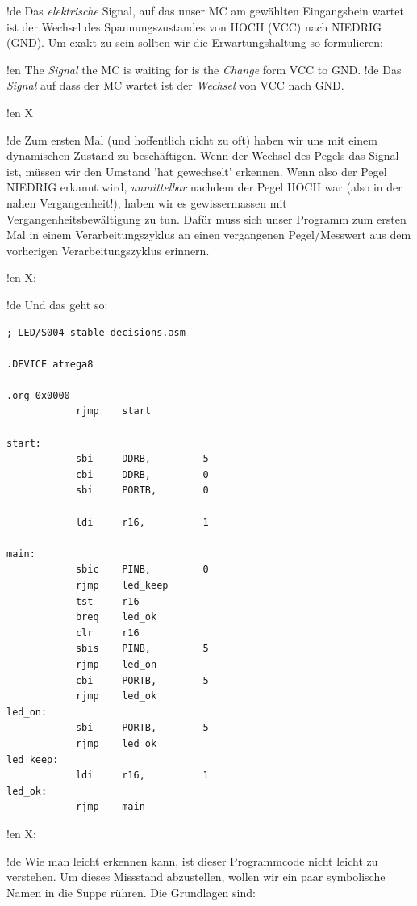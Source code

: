 !de Das \textit{elektrische} Signal, auf das unser MC am gewählten Eingangsbein wartet ist der Wechsel des Spannungszustandes von HOCH (VCC) nach NIEDRIG (GND). Um exakt zu sein sollten wir die Erwartungshaltung so formulieren:

\begin{center}
!en The \emph{Signal} the MC is waiting for is the \emph{Change} form VCC to GND.
!de Das \emph{Signal} auf dass der MC wartet ist der \emph{Wechsel} von VCC nach GND.
\end{center}



!en X

!de Zum ersten Mal (und hoffentlich nicht zu oft) haben wir uns mit einem dynamischen Zustand zu beschäftigen. Wenn der Wechsel des Pegels das Signal ist, müssen wir den Umstand 'hat gewechselt' erkennen. Wenn also der Pegel NIEDRIG erkannt wird, \textit{unmittelbar} nachdem der Pegel HOCH war (also in der nahen Vergangenheit!), haben wir es gewissermassen mit Vergangenheitsbewältigung zu tun. Dafür muss sich unser Programm zum ersten Mal in einem Verarbeitungszyklus an einen vergangenen Pegel/Messwert aus dem vorherigen Verarbeitungszyklus erinnern.


!en X:

!de Und das geht so:

\begin{lstlisting}
; LED/S004_stable-decisions.asm

.DEVICE atmega8

.org 0x0000
            rjmp    start

start:
            sbi     DDRB,         5
            cbi     DDRB,         0
            sbi     PORTB,        0

            ldi     r16,          1

main:
            sbic    PINB,         0
            rjmp    led_keep
            tst     r16
            breq    led_ok
            clr     r16
            sbis    PINB,         5
            rjmp    led_on
            cbi     PORTB,        5
            rjmp    led_ok
led_on:
            sbi     PORTB,        5
            rjmp    led_ok
led_keep:
            ldi     r16,          1
led_ok:
            rjmp    main
\end{lstlisting}



!en X:

!de Wie man leicht erkennen kann, ist dieser Programmcode nicht leicht zu verstehen. Um dieses Missstand abzustellen, wollen wir ein paar symbolische Namen in die Suppe rühren. Die Grundlagen sind:

